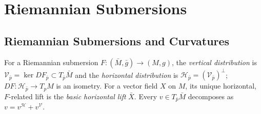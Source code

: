 \section{Riemannian Submersions}

\subsection{Riemannian Submersions and Curvatures}

\begin{definition}
  \label{def:pet-ch4-vertical-horizontal-distribution}
  For a Riemannian submersion $F:(\bar M,\bar g)\to(M,g)$, the \emph{vertical
  distribution} is $\mathcal V_{\bar p}=\ker DF_{\bar p}\subset T_{\bar p}\bar M$
  and the \emph{horizontal distribution} is $\mathcal H_{\bar p}=(\mathcal V_{\bar p})^\perp$;
  $DF:\mathcal H_{\bar p}\to T_pM$ is an isometry. For a vector field $X$ on
  $M$, its unique horizontal, $F$-related lift is the \emph{basic horizontal
  lift} $\bar X$. Every $v\in T_{\bar p}\bar M$ decomposes as $v=v^{\mathcal H}+v^{\mathcal V}$.
\end{definition}

